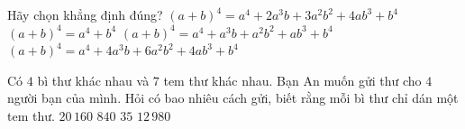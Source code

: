 \begin{ex}%
Hãy chọn khẳng định đúng?
\choice
{$(a+b)^4=a^4+2a^3b+3a^2b^2+4ab^3+b^4$}
{$(a+b)^4=a^4+b^4$}
{$(a+b)^4=a^4+a^3b+a^2b^2+ab^3+b^4$}
{\True $(a+b)^4=a^4+4a^3b+6a^2b^2+4ab^3+b^4$}
\end{ex}

\begin{ex}%
Có $4$ bì thư khác nhau và $7$ tem thư khác nhau. Bạn An muốn gửi thư cho $4$ người bạn của mình. Hỏi có bao nhiêu cách gửi, biết rằng mỗi bì thư chỉ dán một tem thư.
\choice
{\True $20\,160$}
{$840$}
{$35$}
{$12\,980$}
\end{ex}

